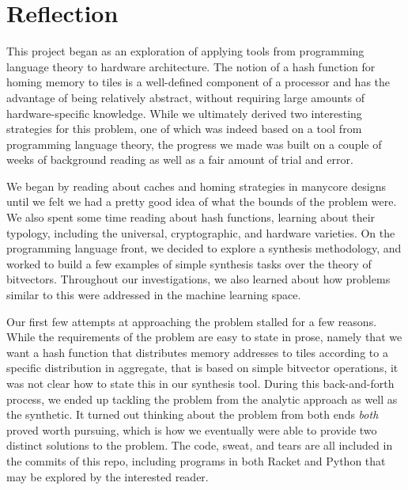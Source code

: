 
\section{Reflection}
\label{sec:Reflection}

This project began as an exploration of applying tools from programming language
theory to hardware architecture.  The notion of a hash function for homing
memory to tiles is a well-defined component of a processor and has the advantage
of being relatively abstract, without requiring large amounts of hardware-specific
knowledge.  While we ultimately derived two interesting strategies for this
problem, one of which was indeed based on a tool from programming language
theory, the progress we made was built on a couple of weeks of background
reading as well as a fair amount of trial and error.

We began by reading about caches and homing strategies in manycore designs until
we felt we had a pretty good idea of what the bounds of the problem were.  We
also spent some time reading about hash functions, learning about their
typology, including the universal, cryptographic, and hardware varieties.  On
the programming language front, we decided to explore a synthesis methodology,
and worked to build a few examples of simple synthesis tasks over the theory of
bitvectors.  Throughout our investigations, we also learned about how problems
similar to this were addressed in the machine learning space.

Our first few attempts at approaching the problem stalled for a few reasons.
While the requirements of the problem are easy to state in prose, namely that we
want a hash function that distributes memory addresses to tiles according to a
specific distribution in aggregate, that is based on simple bitvector
operations, it was not clear how to state this in our synthesis tool.  During
this back-and-forth process, we ended up tackling the problem from the analytic
approach as well as the synthetic.  It turned out thinking about the problem
from both ends \textit{both} proved worth pursuing, which is how we eventually
were able to provide two distinct solutions to the problem.  The code, sweat,
and tears are all included in the commits of this repo, including programs in
both Racket and Python that may be explored by the interested reader.


